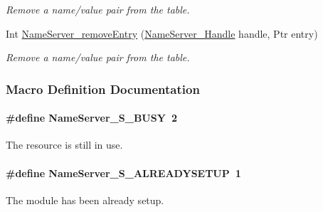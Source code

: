 \begin{DoxyCompactItemize}
\begin{DoxyCompactList}\small\item\em Remove a name/value pair from the table. \end{DoxyCompactList}\item 
Int \hyperlink{_name_server_8h_a84b6883f07de21bcaf8f4dbdc2e55e63}{Name\-Server\-\_\-remove\-Entry} (\hyperlink{_name_server_8h_a99fa93c4ee4169db90162b523d9152d4}{Name\-Server\-\_\-\-Handle} handle, Ptr entry)
\begin{DoxyCompactList}\small\item\em Remove a name/value pair from the table. \end{DoxyCompactList}\end{DoxyCompactItemize}


\subsubsection{Macro Definition Documentation}
\paragraph[{Name\-Server\-\_\-\-S\-\_\-\-B\-U\-S\-Y}]{\setlength{\rightskip}{0pt plus 5cm}\#define Name\-Server\-\_\-\-S\-\_\-\-B\-U\-S\-Y~2}\label{_name_server_8h_a57542b4fd6b5d46d78064ae92215bc4b}


The resource is still in use. 

\paragraph[{Name\-Server\-\_\-\-S\-\_\-\-A\-L\-R\-E\-A\-D\-Y\-S\-E\-T\-U\-P}]{\setlength{\rightskip}{0pt plus 5cm}\#define Name\-Server\-\_\-\-S\-\_\-\-A\-L\-R\-E\-A\-D\-Y\-S\-E\-T\-U\-P~1}\label{_name_server_8h_a66224beb4a7f1cc92923a8fe630429ce}


The module has been already setup. 

